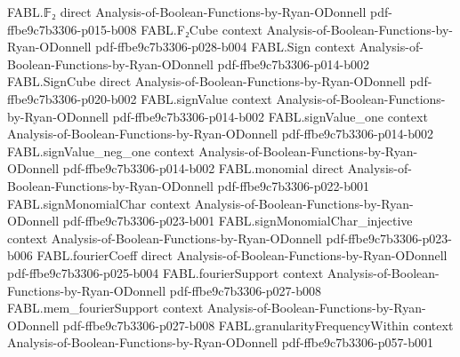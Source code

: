 \begin{theorem}
\label{FABL.oddWeightPartialSumPCPPSystem_rejectionProbability}
\leanok
{}
\proofstep
  {FABL.𝔽₂}
  {direct}
  {Analysis-of-Boolean-Functions-by-Ryan-ODonnell}
  {pdf-ffbe9c7b3306-p015-b008}
\proofstep
  {FABL.F₂Cube}
  {context}
  {Analysis-of-Boolean-Functions-by-Ryan-ODonnell}
  {pdf-ffbe9c7b3306-p028-b004}
\proofstep
  {FABL.Sign}
  {context}
  {Analysis-of-Boolean-Functions-by-Ryan-ODonnell}
  {pdf-ffbe9c7b3306-p014-b002}
\proofstep
  {FABL.SignCube}
  {direct}
  {Analysis-of-Boolean-Functions-by-Ryan-ODonnell}
  {pdf-ffbe9c7b3306-p020-b002}
\proofstep
  {FABL.signValue}
  {context}
  {Analysis-of-Boolean-Functions-by-Ryan-ODonnell}
  {pdf-ffbe9c7b3306-p014-b002}
\proofstep
  {FABL.signValue_one}
  {context}
  {Analysis-of-Boolean-Functions-by-Ryan-ODonnell}
  {pdf-ffbe9c7b3306-p014-b002}
\proofstep
  {FABL.signValue_neg_one}
  {context}
  {Analysis-of-Boolean-Functions-by-Ryan-ODonnell}
  {pdf-ffbe9c7b3306-p014-b002}
\proofstep
  {FABL.monomial}
  {direct}
  {Analysis-of-Boolean-Functions-by-Ryan-ODonnell}
  {pdf-ffbe9c7b3306-p022-b001}
\proofstep
  {FABL.signMonomialChar}
  {context}
  {Analysis-of-Boolean-Functions-by-Ryan-ODonnell}
  {pdf-ffbe9c7b3306-p023-b001}
\proofstep
  {FABL.signMonomialChar_injective}
  {context}
  {Analysis-of-Boolean-Functions-by-Ryan-ODonnell}
  {pdf-ffbe9c7b3306-p023-b006}
\proofstep
  {FABL.fourierCoeff}
  {direct}
  {Analysis-of-Boolean-Functions-by-Ryan-ODonnell}
  {pdf-ffbe9c7b3306-p025-b004}
\proofstep
  {FABL.fourierSupport}
  {context}
  {Analysis-of-Boolean-Functions-by-Ryan-ODonnell}
  {pdf-ffbe9c7b3306-p027-b008}
\proofstep
  {FABL.mem_fourierSupport}
  {context}
  {Analysis-of-Boolean-Functions-by-Ryan-ODonnell}
  {pdf-ffbe9c7b3306-p027-b008}
\proofstep
  {FABL.granularityFrequencyWithin}
  {context}
  {Analysis-of-Boolean-Functions-by-Ryan-ODonnell}
  {pdf-ffbe9c7b3306-p057-b001}

\end{theorem}

